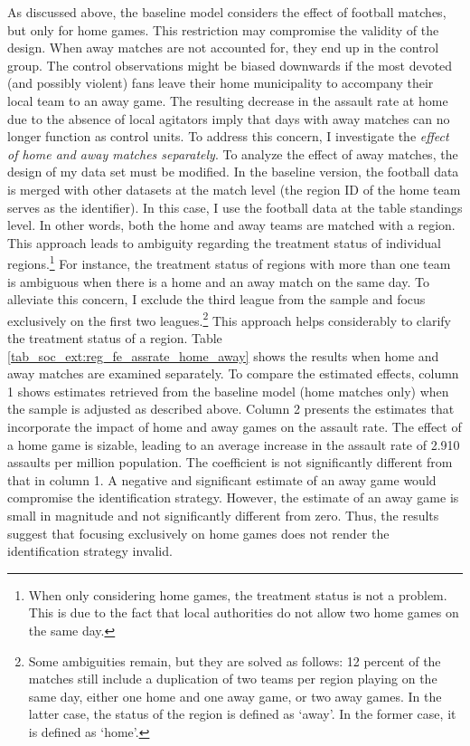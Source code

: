 As discussed above, the baseline model considers the effect of football matches, but only for home games. This restriction may compromise the validity of the design. When away matches are not accounted for, they end up in the control group. The control observations might be biased downwards if the most devoted (and possibly violent) fans leave their home municipality to accompany their local team to an away game. The resulting decrease in the assault rate at home due to the absence of local agitators imply that days with away matches can no longer function as control units. To address this concern, I investigate the \textit{effect of home and away matches separately}. To analyze the effect of away matches, the design of my data set must be modified. In the baseline version, the football data is merged with other datasets at the match level (the region ID of the home team serves as the identifier). In this case, I use the football data at the table standings level. In other words, both the home and away teams are matched with a region. This approach leads to ambiguity regarding the treatment status of individual regions.\footnote{When only considering home games, the treatment status is not a problem. This is due to the fact that local authorities do not allow two home games on the same day.} For instance, the treatment status of regions with more than one team is ambiguous when there is a home and an away match on the same day. To alleviate this concern, I exclude the third league from the sample and focus exclusively on the first two leagues.\footnote{Some ambiguities remain, but they are solved as follows: 12 percent of the matches still include a duplication of two teams per region playing on the same day, either one home and one away game, or two away games. In the latter case, the status of the region is defined as `away'. In the former case, it is defined as `home'.} This approach helps considerably to clarify the treatment status of a region. Table \ref{tab_soc_ext:reg_fe_assrate_home_away} shows the results when home and away matches are examined separately. To compare the estimated effects, column 1 shows estimates retrieved from the baseline model (home matches only) when the sample is adjusted as described above. Column 2 presents the estimates that incorporate the impact of home and away games on the assault rate. The effect of a home game is sizable, leading to an average increase in the assault rate of 2.910 assaults per million population. The coefficient is not significantly different from that in column 1. A negative and significant estimate of an away game would compromise the identification strategy. However, the estimate of an away game is small in magnitude and not significantly different from zero. Thus, the results suggest that focusing exclusively on home games does not render the identification strategy invalid. 




